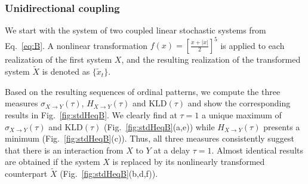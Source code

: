 \documentclass[12pt,aip,cha,reprint,nofootinbib]{revtex4-1}
\begin{document}
\subsubsection{Unidirectional coupling}

We start with the system of two coupled linear stochastic systems from Eq.~\eqref{eq:B}. A nonlinear transformation $f(x) = \left[\frac{x + | x |}{2}\right]^{5}$ is applied to each realization of the first system $X$, and the resulting realization of the transformed system $\tilde{X}$ is denoted as $\{\tilde{x}_t\}$. 

Based on the resulting sequences of ordinal patterns, we compute the three measures $\sigma_{X \to Y}(\tau)$, $H_{X \to Y}(\tau)$ and $\text{KLD}(\tau)$ and show the corresponding results in Fig.~\ref{fig:stdHeqB}. We clearly find at $\tau = 1$ a unique maximum of $\sigma_{X \to Y}(\tau)$ and $\text{KLD}(\tau)$ (Fig.~\ref{fig:stdHeqB}(a,e)) while $H_{X\to Y}(\tau)$ presents a minimum (Fig.~\ref{fig:stdHeqB}(c)). Thus, all three measures consistently suggest that there is an interaction from $X$ to $Y$ at a delay $\tau = 1$. Almost identical results are obtained if the system $X$ is replaced by its nonlinearly transformed counterpart $\tilde{X}$ (Fig.~\ref{fig:stdHeqB}(b,d,f)). 
\end{document}
